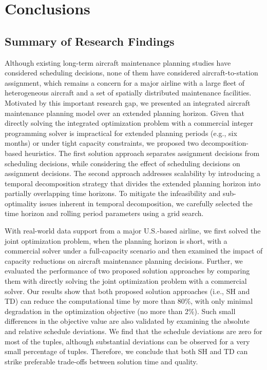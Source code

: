 \section{Conclusions}
\label{section:conclusions}
\subsection{Summary of Research Findings}
Although existing long-term aircraft maintenance planning studies have considered scheduling decisions, none of them have considered aircraft-to-station assignment, which remains a concern for a major airline with a large fleet of heterogeneous aircraft and a set of spatially distributed maintenance facilities. 
Motivated by this important research gap, we presented an integrated aircraft maintenance planning model over an extended planning horizon.  Given that directly solving the integrated optimization problem with a commercial integer programming solver is impractical for extended planning periods (e.g., six months) or under tight capacity constraints, we proposed two decomposition-based heuristics. The first solution approach separates assignment decisions from scheduling decisions, while considering the effect of scheduling decisions on assignment decisions. The second approach addresses scalability by introducing a temporal decomposition strategy that divides the extended planning horizon into partially overlapping time horizons. To mitigate the infeasibility and sub-optimality issues inherent in temporal decomposition, we carefully selected the time horizon and rolling period parameters using a grid search.
 
With real-world data support from a major U.S.-based airline, we first solved the joint optimization problem, when the planning horizon is short, with a commercial solver under a full-capacity scenario and then examined the impact of capacity reductions on aircraft maintenance planning decisions. Further, we evaluated the performance of two proposed solution approaches by comparing them with directly solving the joint optimization problem with a commercial solver. Our results show that both proposed solution approaches (i.e., SH and TD) can reduce the computational time by more than 80\%, with only minimal degradation in the optimization objective (no more than 2\%). Such small differences in the objective value are also validated by examining the absolute and relative schedule deviations. We find that the schedule deviations are zero for most of the tuples, although substantial deviations can be observed for a very small percentage of tuples. Therefore, we conclude that both SH and TD can strike preferable trade-offs between solution time and quality.

